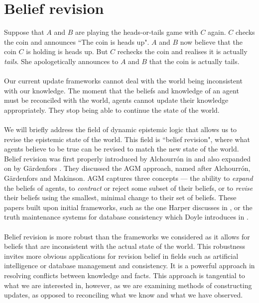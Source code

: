 \section{Belief revision}

Suppose that $A$ and $B$ are playing the heads-or-tails game with $C$ again.
$C$ checks the coin and announces ``The coin is heads up".
$A$ and $B$ now believe that the coin $C$ is holding is heads up.
But $C$ rechecks the coin and realises it is actually {\em tails}.
She apologetically announces to $A$ and $B$ that the coin is actually tails.\\
\\
Our current update frameworks cannot deal with the world being inconsistent with
our knowledge.
The moment that the beliefs and knowledge of an agent must be reconciled with
the world, agents cannot update their knowledge appropriately.
They stop being able to continue the state of the world.\\
\\
We will briefly address the field of dynamic epistemic logic that allows us to revise the epistemic state of the
world.
This field is ``belief revision", where what agents believe to be true can be
revised to match the new state of the world.
Belief revision was first properly introduced by Alchourr{\'o}n in \cite{theLogicOfTheoryChange} and also
expanded on by G{\"a}rdenfors \cite{gairdenfors1988knowledge}.
They discussed the AGM approach, named after Alchourr{\'o}n, G{\"a}rdenfors and Makinson.
AGM captures three concepts --- the ability to {\em expand} the beliefs of agents, to {\em contract}
or reject some subset of their beliefs, or to {\em revise} their beliefs using the smallest, minimal
change to their set of beliefs.
These papers built upon initial frameworks, such as the one Harper discusses in
\cite{harper1976rational}, or the truth maintenance systems for database
consistency which Doyle introduces in \cite{Doyle1979231}.\\
\\
Belief revision is more robust than the frameworks we considered as it allows
for beliefs that are inconsistent with the actual state of the world.
This robustness invites more obvious applications for revision belief in fields such as
artificial intelligence or database management and consistency.
It is a powerful approach in resolving conflicts between knowledge and facts.
This approach is tangential to what we are interested in, however, as we are
examining methods of constructing updates, as opposed to reconciling what we
know and what we have observed.

